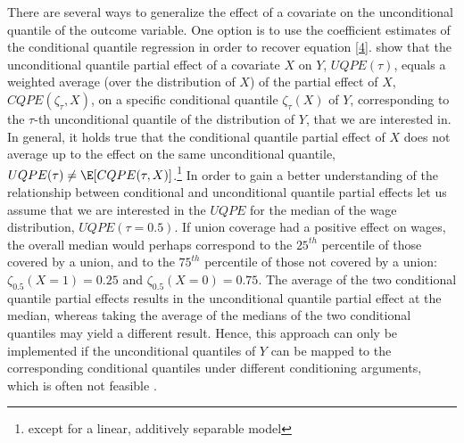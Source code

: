 There are several ways to generalize the effect of a covariate on the unconditional quantile of the outcome variable. One option is to use the coefficient estimates of the conditional quantile regression in order to recover equation \ref{4}. \cite{Firpo&Fortin&Lemieux:09} show that the unconditional quantile partial effect of a covariate $X$ on $Y$, $UQPE(\tau)$, equals a weighted average (over the distribution of $X$) of the partial effect of $X$, $CQPE(\zeta_{\tau}, X)$, on a specific conditional quantile $\zeta_{\tau}(X)$ of $Y$, corresponding to the $\tau$-th unconditional quantile of the distribution of $Y$, that we are interested in. In general, it holds true that the conditional quantile partial effect of $X$ does not average up to the effect on the same unconditional quantile, $UQPE(\tau) \neq \E[CQPE(\tau, X)]$.\footnote{ except for a linear, additively separable model} In order to gain a better understanding of the relationship between conditional and unconditional quantile partial effects let us assume that we are interested in the $UQPE$ for the median of the wage distribution, $UQPE(\tau = 0.5)$. If union coverage had a positive effect on wages, the overall median would perhaps correspond to the $25^{th}$ percentile of those covered by a union, and to the $75^{th}$ percentile of those not covered by a union: $\zeta_{0.5}(X=1)=0.25$ and $\zeta_{0.5}(X=0)=0.75$. The average of the two conditional quantile partial effects results in the unconditional quantile partial effect at the median, whereas taking the average of the medians of the two conditional quantiles may yield a different result. Hence, this approach can only be implemented if the unconditional quantiles of $Y$ can be mapped to the corresponding conditional quantiles under different conditioning arguments, which is often not feasible \citep{Borah&Basu:2013}.

